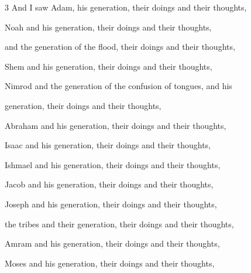 \par 3 And I saw Adam, his generation, their doings and their thoughts,
\par Noah and his generation, their doings and their thoughts, 
\par and the generation of the flood, their doings and their thoughts, 
\par Shem and his generation, their doings and their thoughts, 
\par Nimrod and the generation of the confusion of tongues, and his 
\par generation, their doings and their thoughts, 
\par Abraham and his generation, their doings and their thoughts, 
\par Isaac and his generation, their doings and their thoughts, 
\par Ishmael and his generation, their doings and their thoughts,
\par Jacob and his generation, their doings and their thoughts, 
\par Joseph and his generation, their doings and their thoughts, 
\par the tribes and their generation, their doings and their thoughts, 
\par Amram and his generation, their doings and their thoughts, 
\par Moses and his generation, their doings and their thoughts, 

